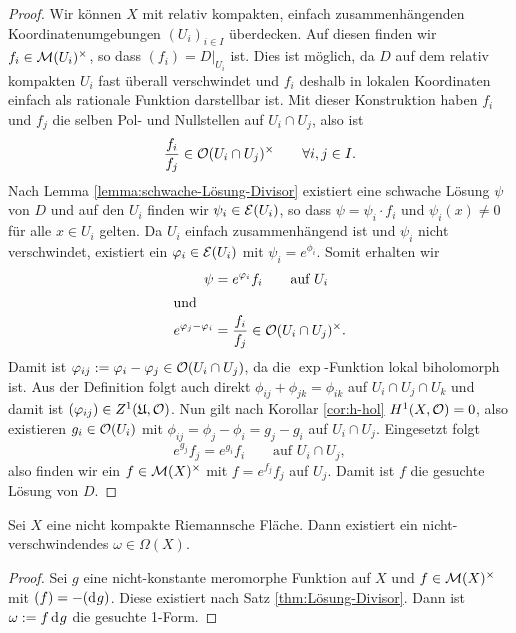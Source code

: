 \begin{proof}
  Wir können $X$ mit relativ kompakten, einfach zusammenhängenden
  Koordinatenumgebungen $(U_i)_{i \in I}$ überdecken. Auf diesen
  finden wir $f_i \in \mathcal{M}(U_i)^\times$, so dass $(f_i) =
  D|_{U_i}$ ist. Dies ist möglich, da $D$ auf dem relativ kompakten $U_i$
  fast überall verschwindet und $f_i$ deshalb in lokalen Koordinaten
  einfach als rationale Funktion darstellbar ist. 
  Mit dieser Konstruktion haben $f_i$ und $f_j$ die selben Pol- und
  Nullstellen auf $U_i \cap U_j$, also ist
  \[
  \frac{f_i}{f_j} \in \mathcal{O}(U_i \cap U_j)^\times \qquad \forall i,j \in I.
  \]
  Nach Lemma \ref{lemma:schwache-Lösung-Divisor} existiert eine
  schwache Lösung $\psi$ von $D$ und auf den $U_i$ finden wir $\psi_i
  \in \mathcal{E}(U_i)$, so dass $\psi = \psi_i \cdot f_i$ und $\psi_i(x)
  \neq 0$ für alle $x \in U_i$ gelten. 
  Da $U_i$ einfach zusammenhängend ist und $\psi_i$ nicht
  verschwindet, existiert ein $\varphi_i \in \mathcal{E}(U_i)$ mit $\psi_i =
  e^{\phi_i}$. Somit erhalten wir
  \begin{align*}
  \psi & = e^{\varphi_i} f_i \qquad \text{auf } U_i \\
  \intertext{und}
  e^{\varphi_j - \varphi_i} & = \frac{f_i}{f_j} \in \mathcal{O}(U_i \cap U_j)^\times.
  \end{align*}
  Damit ist $\varphi_{ij} := \varphi_i - \varphi_j \in \mathcal{O}(U_i \cap U_j)$, da
  die $\exp$-Funktion lokal biholomorph ist. Aus der Definition folgt
  auch direkt $\phi_{ij} + \phi_{jk} = \phi_{ik}$ auf $U_i \cap U_j
  \cap U_k$ und damit ist $(\varphi_{ij}) \in Z^1(\mathfrak{U}, \mathcal{O})$. 
  Nun gilt nach Korollar \ref{cor:h-hol} $H^1(X, \mathcal{O}) = 0$, also existieren $g_i \in \mathcal{O}(U_i)$ mit
  $\phi_{ij} = \phi_j - \phi_i = g_j - g_i$ auf $U_i \cap U_j$.
  Eingesetzt folgt
  \[
  e^{g_j} f_j = e^{g_i} f_i \qquad \text{auf } U_i \cap U_j,
  \]
  also finden wir ein $f \in \mathcal{M}(X)^\times$ mit $f = e^{f_j} f_j$ auf
  $U_j$. Damit ist $f$ die gesuchte Lösung von $D$.
\end{proof}

\begin{cor}
  \label{cor:nicht-verschwindende-1-form}
  Sei $X$ eine nicht kompakte Riemannsche Fläche. 
  Dann existiert ein nicht-verschwindendes $\omega \in \Omega(X)$.
\end{cor}

\begin{proof}
  Sei $g$ eine nicht-konstante meromorphe Funktion auf $X$ und $f \in
  \mathcal{M}(X)^\times$ mit $(f) = -(\d[g])$. Diese existiert nach Satz
  \ref{thm:Lösung-Divisor}. Dann ist $\omega := f \d[g]$ die gesuchte 1-Form.
\end{proof}


